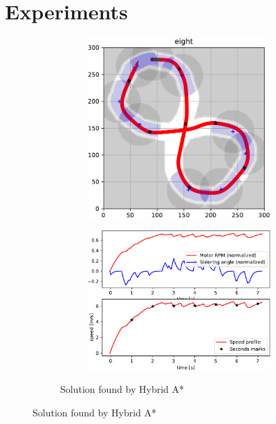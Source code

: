 \chapter{Experiments}
\label{chapter:experiments}

\begin{figure}[!tbp]%
	\centering
	\begin{subfigure}[t]{\textwidth}
		\begin{subfigure}[t]{0.45\textwidth}
			\includegraphics[width=\textwidth]{../img/experiments/eight-hybrid_astar-trajectory}
		\end{subfigure}
		\hfill
		\begin{subfigure}[t]{0.45\textwidth}
			\includegraphics[width=\textwidth]{../img/experiments/eight-hybrid_astar-actuators}
		\end{subfigure}
		\caption{Solution found by Hybrid A*}
		\label{fig:eight-hybrid_astar}
	\end{subfigure}
	

\end{figure}
